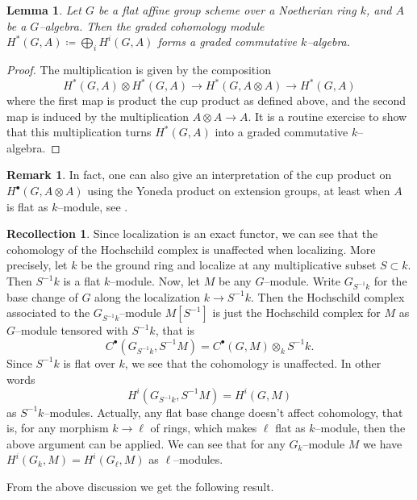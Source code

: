 \documentclass{article}
\theoremstyle{plain}
\newtheorem{Lemma}[Th]{Lemma}
\theoremstyle{definition}
\newtheorem{Rem}[Th]{Remark}
\newtheorem{Rec}[Th]{Recollection}
\begin{document}
\begin{Lemma}
   Let $G$ be a flat affine group scheme over a Noetherian ring $k$, and $A$ be a $G$--algebra. Then the graded cohomology module $H^\ast(G,A)\coloneqq\bigoplus_i H^i(G, A)$ forms a graded commutative $k$--algebra.
\end{Lemma}

\begin{proof}
 The multiplication is given by the composition 
   \[
   H^\ast(G,A)\otimes H^\ast(G,A)\to H^\ast(G,A\otimes A)\to H^\ast(G,A)
   \]
    where the first map is product the cup product as defined above, and the second map is induced by the multiplication $A\otimes A\to A$. It is a routine exercise to show that this multiplication turns $H^\ast(G,A)$ into a graded commutative $k$--algebra.  
\end{proof}


\begin{Rem}
    In fact, one can also give an interpretation of the cup product on $H^\bullet(G,A\otimes A)$ using the Yoneda product on extension groups, at least when $A$ is flat as $k$--module, see \cite[Lemma 2.5]{touze2010cohomology}.  
\end{Rem}




\begin{Rec}
    Since localization is an exact functor, we can see that the cohomology of the Hochschild complex is unaffected when localizing. More precisely, let $k$ be the ground ring and localize at any multiplicative subset $S \subset k$. Then $S^{-1}k$ is a flat $k$--module. Now, let $M$ be any $G$--module. Write $G_{S^{-1}k}$ for the base change of $G$ along the localization $k\to S^{-1}k$.  Then the Hochschild complex associated to the $G_{S^{-1}k}$--module $M[S^{-1}]$ is just the Hochschild complex for $M$ as $G$--module tensored with $S^{-1}k$, that is
    \[
    C^\bullet(G_{S^{-1}k}, S^{-1}M)=C^\bullet(G, M)\otimes_k S^{-1}k.
    \]
    Since $S^{-1}k$ is flat over $k$, we see that the cohomology is unaffected. In other words 
    \[
    H^i(G_{S^{-1}k}, S^{-1}M)=H^i(G, M)
    \]
    as $S^{-1}k$--modules. Actually, any flat base change doesn't affect cohomology, that is, for any morphism $k\to \ell$ of rings, which makes $\ell$ flat as $k$--module, then the above argument can be applied. We can see that for any $G_k$--module $M$ we have $H^i(G_k, M)=H^i(G_\ell, M)$ as $\ell$--modules.
\end{Rec}

From the above discussion we get the following result.
\end{document}
